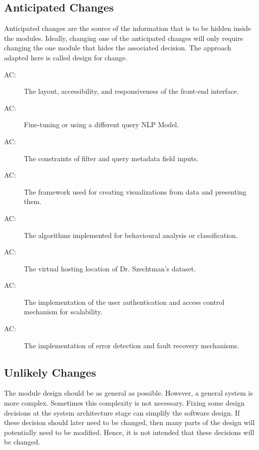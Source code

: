 \documentclass[12pt, titlepage]{article}
\newcounter{acnum}
\newcommand{\actheacnum}{AC\theacnum}
\begin{document}
\subsection{Anticipated Changes} \label{SecAchange}

Anticipated changes are the source of the information that is to be hidden
inside the modules. Ideally, changing one of the anticipated changes will only
require changing the one module that hides the associated decision. The approach
adapted here is called design for
change.

\begin{description}
\item[ \actheacnum \label{acUIDesign}:] The layout, accessibility, 
  and responsiveness of the front-end interface.
\item[ \actheacnum \label{acQueryLLM}:] Fine-tuning or using a 
  different query NLP Model.
\item[ \actheacnum \label{acFiltersAndQueryParameters}:] The constraints of filter and query 
  metadata field inputs.
\item[ \actheacnum \label{acDataVisualization}:] The framework used for 
  creating visualizations from data and presenting them.
\item[ \actheacnum \label{acProcessingAlgorithms}:] The algorithms implemented for 
  behavioural analysis or classification.
\item[ \actheacnum \label{acDatasetHosting}:] The virtual hosting location of 
  Dr. Szechtman's dataset.
\item[ \actheacnum \label{acAccessControl}:] The implementation of the user authentication 
  and access control mechanism for scalability.
\item[ \actheacnum \label{acErrorAndFaultHandling}:] The implementation of 
  error detection and fault recovery mechanisms.
\end{description}

\subsection{Unlikely Changes} \label{SecUchange}

The module design should be as general as possible. However, a general system is
more complex. Sometimes this complexity is not necessary. Fixing some design
decisions at the system architecture stage can simplify the software design. If
these decision should later need to be changed, then many parts of the design
will potentially need to be modified. Hence, it is not intended that these
decisions will be changed.
\end{document}

